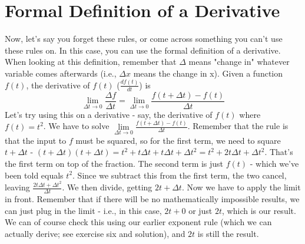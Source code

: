 \chapter{Formal Definition of a Derivative}
Now, let's say you forget these rules, or come across something you can't use these rules on. In this case, you can use the formal definition of a derivative. When looking at this definition, remember that $\Delta$ means "change in" whatever variable comes afterwards (i.e., $\Delta x$ means the change in x). Given a function $f(t)$, the derivative of $f(t)$ ($\frac{df(t)}{dt}$) is \begin{equation}
    \lim\limits_{\Delta t\rightarrow 0}\frac{\Delta f}{\Delta t} = \lim\limits_{\Delta t\rightarrow 0}\frac{f(t+\Delta t)-f(t)}{\Delta t}
\end{equation}
Let's try using this on a derivative - say, the derivative of $f(t)$ where $f(t) = t^2$. We have to solve $\lim\limits_{\Delta t\rightarrow 0}\frac{f(t+\Delta t)-f(t)}{\Delta t}$. Remember that the rule is that the input to $f$ must be squared, so for the first term, we need to square $t+\Delta t$ - $(t+\Delta t)(t+\Delta t) = t^2+t\Delta t+t\Delta t + \Delta t^2 = t^2+2t\Delta t+\Delta t^2$. That's the first term on top of the fraction. The second term is just $f(t)$ - which we've been told equals $t^2$. Since we subtract this from the first term, the two cancel, leaving $\frac{2t\Delta t+\Delta t^2}{\Delta t}$. We then divide, getting $2t+\Delta t$. Now we have to apply the limit in front. Remember that if there will be no mathematically impossible results, we can just plug in the limit - i.e., in this case, $2t+0$ or just $2t$, which is our result. We can of course check this using our earlier exponent rule (which we can actually derive; see exercise six and solution), and $2t$ is still the result.
